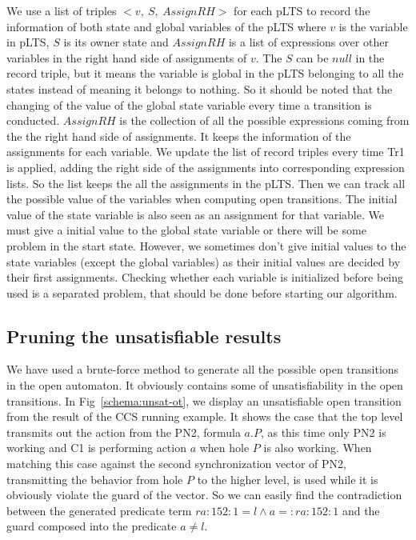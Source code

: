 \documentclass{lncs/llncs}
\begin{document}
We use a list of triples $<v,\ S, \ AssignRH>$ for each pLTS to record
the information of both state and global variables of the pLTS where $v$ is the  variable in pLTS, $S$ is its owner state and $AssignRH$ is a list of expressions over other variables in the right hand side of assignments of $v$. The $S$ can be $null$ in the record triple, but it means the variable is global in the pLTS belonging to all the states instead of meaning it belongs to nothing. So it should be noted that the changing of the value of the global state variable every time a transition is conducted. $AssignRH$ is the collection of all the possible expressions coming from the the right hand side of assignments. It keeps the information of the assignments for each variable. We update the list of record triples every time Tr1 is applied, adding the right side of the assignments into corresponding expression lists. So the list keeps the all the assignments in the pLTS. Then we can track all the possible value of the variables when computing open transitions. 
The initial value of the state variable is also seen as an assignment
for that variable. We must give a initial value to the global state
variable or there will be some problem in the start state. However, we
sometimes don't give initial values to the state variables (except the
global variables) as their initial values are decided by their first
assignments. Checking whether each variable is initialized before
being used is a separated problem, that should be done before starting
our algorithm.


\subsection{Pruning the unsatisfiable results}

We have used a brute-force method to generate all the possible open
transitions in the open automaton. It obviously contains some of
unsatisfiability in the open transitions. In
Fig~\ref{schema:unsat-ot}, we display an unsatisfiable open transition
from the result of the CCS running example. It shows the case that the
top level transmits out the action from the PN2, formula $a.P$, as
this time only PN2 is working and C1 is performing action $a$ when
hole $P$ is also working. When matching this case against the second
synchronization 
vector of PN2, transmitting the behavior from hole $P$ to the higher
level, is used while it is obviously violate the guard of the
vector. So we can easily find the contradiction between the generated
predicate term $ra:152:1=l \!\land\! a=:ra:152:1$ and the guard
composed into the predicate $a \neq l$.
\end{document}
